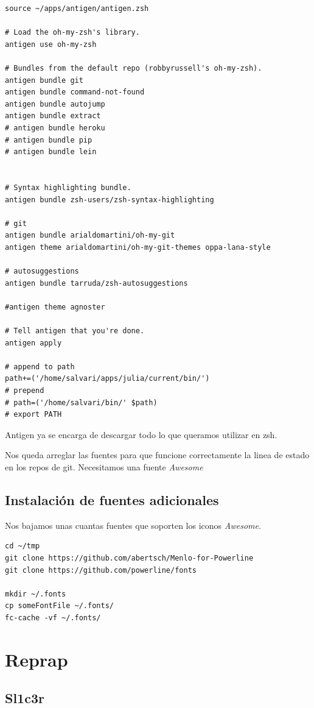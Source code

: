 \documentclass[12pt,spanish,]{scrartcl}
\begin{document}
\begin{verbatim}
source ~/apps/antigen/antigen.zsh

# Load the oh-my-zsh's library.
antigen use oh-my-zsh

# Bundles from the default repo (robbyrussell's oh-my-zsh).
antigen bundle git
antigen bundle command-not-found
antigen bundle autojump
antigen bundle extract
# antigen bundle heroku
# antigen bundle pip
# antigen bundle lein


# Syntax highlighting bundle.
antigen bundle zsh-users/zsh-syntax-highlighting

# git
antigen bundle arialdomartini/oh-my-git
antigen theme arialdomartini/oh-my-git-themes oppa-lana-style

# autosuggestions
antigen bundle tarruda/zsh-autosuggestions

#antigen theme agnoster

# Tell antigen that you're done.
antigen apply

# append to path
path+=('/home/salvari/apps/julia/current/bin/')
# prepend
# path=('/home/salvari/bin/' $path)
# export PATH
\end{verbatim}

Antigen ya se encarga de descargar todo lo que queramos utilizar en zsh.

Nos queda arreglar las fuentes para que funcione correctamente la linea
de estado en los repos de git. Necesitamos una fuente \emph{Awesome}

\subsection{Instalación de fuentes
adicionales}\label{instalaciuxf3n-de-fuentes-adicionales}

Nos bajamos unas cuantas fuentes que soporten los iconos \emph{Awesome}.

\begin{verbatim}
cd ~/tmp
git clone https://github.com/abertsch/Menlo-for-Powerline
git clone https://github.com/powerline/fonts

mkdir ~/.fonts
cp someFontFile ~/.fonts/
fc-cache -vf ~/.fonts/
\end{verbatim}

\section{Reprap}\label{reprap}

\subsection{Sl1c3r}\label{sl1c3r}
\end{document}
